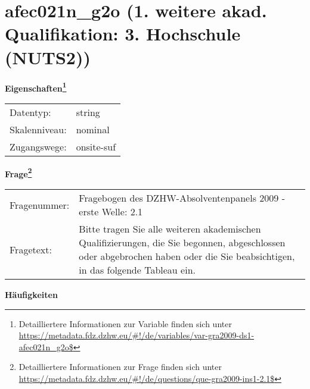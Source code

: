 
    \setcounter{footnote}{0}

    \vspace*{-1.8cm}
	\section{afec021n\_g2o (1. weitere akad. Qualifikation: 3. Hochschule (NUTS2))}
	\label{section:afec021n_g2o}



    \vspace*{0.5cm}
    \noindent\textbf{Eigenschaften\footnote{Detailliertere Informationen zur Variable finden sich unter
		\url{https://metadata.fdz.dzhw.eu/\#!/de/variables/var-gra2009-ds1-afec021n_g2o$}}}\\
	\begin{tabularx}{\hsize}{@{}lX}
	Datentyp: & string \\
	Skalenniveau: & nominal \\
	Zugangswege: &
	  onsite-suf
 \\
    \end{tabularx}



				\vspace*{0.5cm}
                \noindent\textbf{Frage\footnote{Detailliertere Informationen zur Frage finden sich unter
		              \url{https://metadata.fdz.dzhw.eu/\#!/de/questions/que-gra2009-ins1-2.1$}}}\\
				\begin{tabularx}{\hsize}{@{}lX}
					Fragenummer: &
					  Fragebogen des DZHW-Absolventenpanels 2009 - erste Welle:
					  2.1
 \\
					Fragetext: & Bitte tragen Sie alle weiteren akademischen Qualifizierungen, die Sie begonnen, abgeschlossen oder abgebrochen haben oder die Sie beabsichtigen, in das folgende Tableau ein. \\
				\end{tabularx}





        		\vspace*{0.5cm}
                \noindent\textbf{Häufigkeiten}

